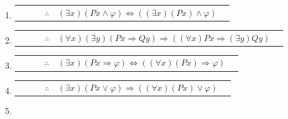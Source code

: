 \documentclass[12pt]{report}
\newcounter{it}
\theoremstyle{largebreak}
\newcounter{tablec}
\begin{document}
\begin{excer}
\begin{enumerate}[label=($\alph*$)]
\begin{center}
\begin{tabular}{l r l c l r}
                \end{tabular}
            \end{center}
            \item \begin{center}
                \setcounter{tablec}{1}
                \begin{tabular}{l r l c l r}
                    \hline
                    & & & $\therefore$ & $(\exists x)(Px\land\varphi)\iff((\exists x)(Px)\land\varphi)$ & \\
                \end{tabular}
            \end{center}
            \item \begin{center}
                \setcounter{tablec}{1}
                \begin{tabular}{l r l c l r}
                    \hline
                    & & & $\therefore$ & $(\forall x)(\exists y)(Px\Rightarrow Qy)\Rightarrow((\forall x)Px\Rightarrow(\exists y)Qy)$ & \\
                \end{tabular}
            \end{center}
            \item \begin{center}
                \setcounter{tablec}{1}
                \begin{tabular}{l r l c l r}
                    \hline
                    & & & $\therefore$ & $(\exists x)(Px\Rightarrow\varphi)\iff((\forall x)(Px)\Rightarrow\varphi)$ & \\
                \end{tabular}
            \end{center}
            \item \begin{center}
                \setcounter{tablec}{1}
                \begin{tabular}{l r l c l r}
                    \hline
                    & & & $\therefore$ & $(\exists x)(Px\lor\varphi)\Rightarrow((\forall x)(Px)\lor\varphi)$ & \\
                \end{tabular}
            \end{center}
            \item \begin{center}
                \setcounter{tablec}{1}
                \begin{tabular}{l r l c l r}

\end{tabular}
\end{center}
\end{enumerate}
\end{excer}
\end{document}
